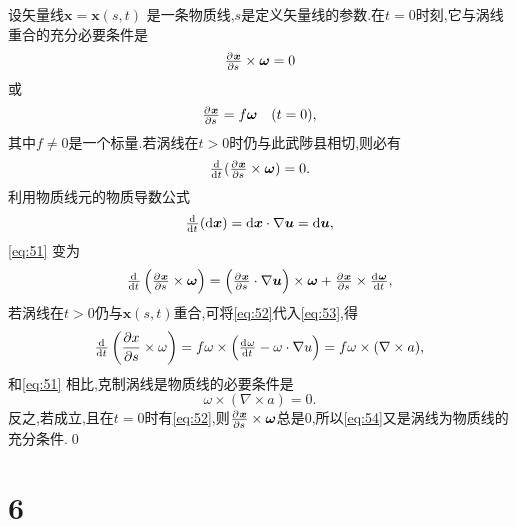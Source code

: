 \documentclass[12pt]{article}
\begin{document}
设矢量线$\bm{x} = \bm{x}(s,t)$ 是一条物质线,$s$是定义矢量线的参数.在$t=0$时刻,它与涡线重合的充分必要条件是
\begin{equation}
	\pd{\bm{x}}{s} \times \bm{\omega} = 0 
\end{equation}
或
\begin{equation}
	\pd{\bm{x}}{s} = f\bm{\omega}\quad(t=0),
	\label{eq:52}
\end{equation}
其中$f\not= 0$是一个标量.若涡线在$t>0$时仍与此武陟县相切,则必有
\begin{equation}
	\od{}{t}(\pd{\bm{x}}{s} \times \bm{\omega}) =0. 
	\label{eq:51}
\end{equation}
利用物质线元的物质导数公式
\begin{equation}
	\od{}{t}(\dif \bm{x}) = \dif \bm{x} \cdot \nabla\bm{u} = \dif \bm{u},
\end{equation}
\cref{eq:51} 变为
\begin{equation}
	\od{}{ t}\left(\pd{ \bm{x}}{ s} \times \bm{\omega}\right)=\left(\pd{ \bm{x}}{ s} \cdot \nabla \bm{u}\right) \times \bm{\omega}+\pd{ \bm{x}}{ s} \times \od{ \bm{\omega}}{ t},
	\label{eq:53}
\end{equation}
若涡线在$t>0$仍与$\bm{x}(s,t)$重合,可将\cref{eq:52}代入\cref{eq:53},得
\begin{equation}
	\od{}{ t}\left(\frac{\partial x}{\partial s} \times \omega\right)=f \omega \times\left(\od{ \omega}{ t}-\omega \cdot \nabla u\right)=f \omega \times(\nabla \times a),
\end{equation}
和\cref{eq:51} 相比,克制涡线是物质线的必要条件是
\begin{equation}
	\omega \times(\nabla \times a) =0.
	\label{eq:54}
\end{equation}
反之,若成立,且在$t=0$时有\cref{eq:52},则$\pd{\bm{x}}{s} \times \bm{\omega}$总是0,所以\ref{eq:54}又是涡线为物质线的充分条件.\qed


\section{6}
\end{document}
